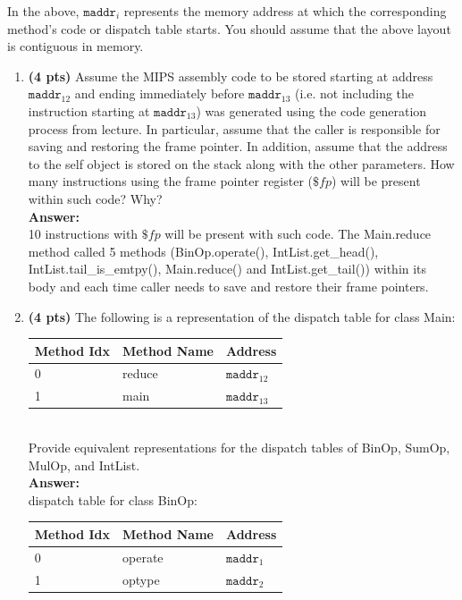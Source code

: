 \documentclass[11pt]{article}
\begin{document}
\begin{enumerate}
  In the above, $\mathtt{maddr}_i$ represents the memory address at which the corresponding method's code or dispatch table starts. You should assume that the above layout is contiguous in memory.
  
  \begin{enumerate}
    \item \textbf{(4 pts)} Assume the MIPS assembly code to be stored starting at address $\mathtt{maddr}_{12}$ and ending immediately before $\mathtt{maddr}_{13}$ (i.e. not including the instruction starting at $\mathtt{maddr}_{13}$) was generated using the code generation process from lecture. In particular, assume that the caller is responsible for saving and restoring the frame pointer. In addition, assume that the address to the self object is stored on the stack along with the other parameters. How many instructions using the frame pointer register ($\$fp$) will be present within such code? Why?\\
    \textbf{Answer:} \\
    10 instructions with $\$fp$ will be present with such code. The Main.reduce method called 5 methods (BinOp.operate(), IntList.get\_head(), IntList.tail\_is\_emtpy(), Main.reduce() and IntList.get\_tail()) within its body and each time caller needs to save and restore their frame pointers.
    
   \newpage
    \item \textbf{(4 pts)} The following is a representation of the dispatch table for class Main: \\
    
    \begin{tabular}{ | l | l | l | }
    \hline
    Method Idx & Method Name & Address \\
    \hline
    0 & reduce & $\mathtt{maddr}_{12}$ \\
    \hline
    1 & main & $\mathtt{maddr}_{13}$ \\
    \hline
    \end{tabular} \\
    
    Provide equivalent representations for the dispatch tables of BinOp, SumOp, MulOp, and IntList.\\
    \textbf{Answer:} \\
	dispatch table for class BinOp: \\
    \begin{tabular}{ | l | l | l | }
    \hline
    Method Idx & Method Name & Address \\
    \hline
    0 & operate & $\mathtt{maddr}_{1}$ \\
    \hline
    1 & optype & $\mathtt{maddr}_{2}$ \\
    \hline
    \end{tabular} \\
	

\end{enumerate}
\end{enumerate}
\end{document}
